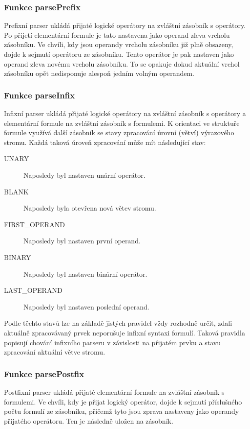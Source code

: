 \documentclass[thesis=B,czech,hidelinks]{thesis}[2012/06/26]
\begin{document}
\subsubsection{Funkce parsePrefix}

Prefixní parser ukládá přijaté logické operátory na zvláštní zásobník s operátory. Po přijetí elementární formule je tato nastavena jako operand zleva vrcholu zásobníku. Ve chvíli, kdy jsou operandy vrcholu zásobníku již plně obsazeny, dojde k sejmutí operátoru ze zásobníku. Tento operátor je pak nastaven jako operand zleva novému vrcholu zásobníku. To se opakuje dokud aktuální vrchol zásobníku opět nedisponuje alespoň jedním volným operandem.

\subsubsection{Funkce parseInfix}

Infixní parser ukládá přijaté logické operátory na zvláštní zásobník s operátory a elementární formule na zvláštní zásobník s formulemi. K orientaci ve struktuře formule využívá další zásobník se stavy zpracování úrovní (větví) výrazového stromu. Každá taková úroveň zpracování může mít následující stav:

\begin{description}
	\item[UNARY] Naposledy byl nastaven unární operátor. 
	\item[BLANK] Naposledy byla otevřena nová větev stromu.
	\item[FIRST\_OPERAND] Naposledy byl nastaven první operand.
	\item[BINARY] Naposledy byl nastaven binární operátor.
	\item[LAST\_OPERAND] Naposledy byl nastaven poslední operand.
\end{description}

Podle těchto stavů lze na základě jistých pravidel vždy rozhodně určit, zdali aktuálně zpracovávaný prvek neporušuje infixní syntaxi formulí. Taková pravidla popisují chování infixního parseru v závislosti na přijatém prvku a stavu zpracování aktuální větve stromu.

\subsubsection{Funkce parsePostfix}

Postfixní parser ukládá přijaté elementární formule na zvláštní zásobník s formulemi. Ve chvíli, kdy je přijat logický operátor, dojde k sejmutí příslušného počtu formulí ze zásobníku, přičemž tyto jsou zprava nastaveny jako operandy přijatého operátoru. Ten je následně uložen na zásobník.
\end{document}
